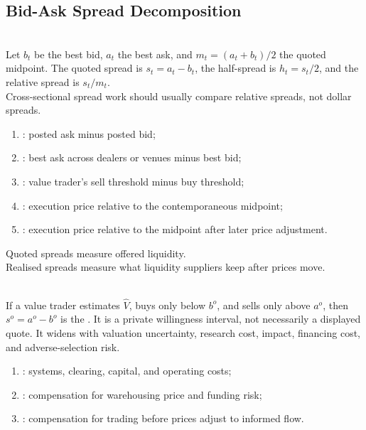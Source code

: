 \subsection{Bid-Ask Spread Decomposition}

\begin{definition} \\
Let $b_t$ be the best bid, $a_t$ the best ask, and $m_t=(a_t+b_t)/2$ the quoted midpoint. The quoted spread is $s_t=a_t-b_t$, the half-spread is $h_t=s_t/2$, and the relative spread is $s_t/m_t$.\\
Cross-sectional spread work should usually compare relative spreads, not dollar spreads.
\end{definition}

\begin{taxonomy} 
\begin{enumerate}[label=\roman*.]
\setlength{\itemsep}{0pt}
\item {}: posted ask minus posted bid;
\item {}: best ask across dealers or venues minus best bid;
\item {}: value trader's sell threshold minus buy threshold;
\item {}: execution price relative to the contemporaneous midpoint;
\item {}: execution price relative to the midpoint after later price adjustment.
\end{enumerate}
Quoted spreads measure offered liquidity.\\
Realised spreads measure what liquidity suppliers keep after prices move.
\end{taxonomy}

\begin{definition} \\
If a value trader estimates $\widehat{V}$, buys only below $b^o$, and sells only above $a^o$, then $s^o=a^o-b^o$ is the . It is a private willingness interval, not necessarily a displayed quote. It widens with valuation uncertainty, research cost, impact, financing cost, and adverse-selection risk.
\end{definition}

\begin{taxonomy} 
\begin{enumerate}[label=\roman*.]
\setlength{\itemsep}{0pt}
\item {}: systems, clearing, capital, and operating costs;
\item {}: compensation for warehousing price and funding risk;
\item {}: compensation for trading before prices adjust to informed flow.
\end{enumerate}
\end{taxonomy}


